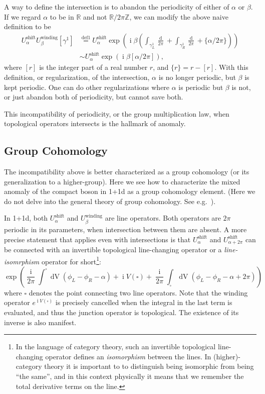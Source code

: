 \documentclass[
  letterpaper,
  DIV=11,
  numbers=noendperiod]{scrreport}
\DeclareMathOperator{\imunit}{i}
\begin{document}
A way to define the intersection is to abandon the periodicity of either
of \(\alpha\) or \(\beta\). If we regard \(\alpha\) to be in
\(\mathbb{R}\) and not \(\mathbb{R}/2\pi\mathbb{Z}\), we can modify the
above naive definition to be \[
\begin{aligned}
U^\text{shift}_\alpha U^\text{winding}_\beta[\gamma^1] &\stackrel{\text{def1}}{=} U^\text{shift}_\alpha \exp\left(\imunit\beta \left(\int_{\gamma^1_L}\frac{\mathop{d\phi_L}}{2\pi} + \int_{\gamma^1_R}\frac{\mathop{d\phi_R}}{2\pi} + \{\alpha/2\pi\}\right)\right)\\
& \sim U^\text{shift}_\alpha \exp\left(\imunit\beta [\alpha/2\pi] \right),
\end{aligned}
\] where \([r]\) is the integer part of a real number \(r\), and
\(\{r\}= r-[r]\). With this definition, or regularization, of the
intersection, \(\alpha\) is no longer periodic, but \(\beta\) is kept
periodic. One can do other regularizations where \(\alpha\) is periodic
but \(\beta\) is not, or just abandon both of periodicity, but cannot
save both.

This incompatibility of periodicity, or the group multiplication law,
when topological operators intersects is the hallmark of anomaly.

\hypertarget{group-cohomology}{%
\subsection{Group Cohomology}\label{group-cohomology}}

The incompatibility above is better characterized as a group cohomology
(or its generalization to a higher-group). Here we see how to
characterize the mixed anomaly of the compact boson in 1+1d as a group
cohomology element. (Here we do not delve into the general theory of
group cohomology. See e.g.~\textcite{TachikawaTasi}).

In 1+1d, both \(U^\text{shift}_\alpha\) and \(U^\text{winding}_\beta\)
are line operators. Both operators are \(2\pi\) periodic in its
parameters, when intersection between them are absent. A more precise
statement that applies even with intersections is that
\(U^\text{shift}_\alpha\) and \(U^\text{shift}_{\alpha+2\pi}\) can be
connected with an invertible topological line-changing operator or a
\emph{line-isomrphism} operator for short\footnote{In the language of
  category theory, such an invertible topological line-changing operator
  defines an \emph{isomorphism} between the lines. In (higher)-category
  theory it is important to to distinguish being isomorphic from being
  ``the same'', and in this context physically it means that we remember
  the total derivative terms on the line.}: \[
 \exp\left(\frac{\imunit}{2\pi} \int^\square \mathop{dV}(\phi_L-\phi_R -\alpha)  + \imunit V(\square)  + \frac{\imunit}{2\pi} \int_\square \mathop{dV}(\phi_L-\phi_R -\alpha+2\pi)  \right)
\] where \(\square\) denotes the point connecting two line operators.
Note that the winding operator \(e^{\imunit V(\square)}\) is precisely
cancelled when the integral in the last term is evaluated, and thus the
junction operator is topological. The existence of its inverse is also
manifest.
\end{document}
